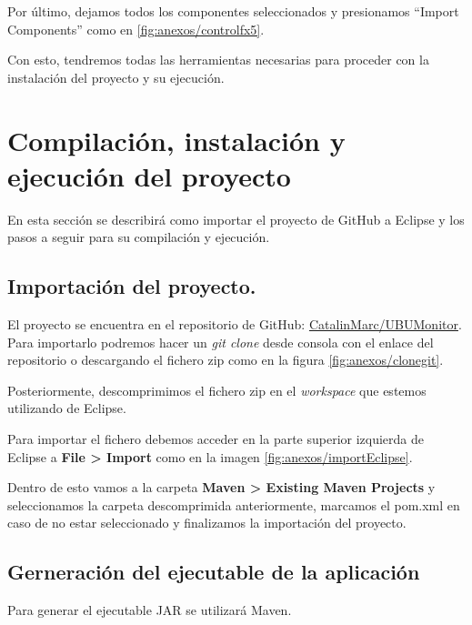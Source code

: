 Por último, dejamos todos los componentes seleccionados y presionamos ``Import Components'' como en \ref{fig:anexos/controlfx5}.


Con esto, tendremos todas las herramientas necesarias para proceder con la instalación del proyecto y su ejecución.

\section{Compilación, instalación y ejecución del proyecto}

En esta sección se describirá como importar el proyecto de GitHub a Eclipse y los pasos a seguir para su compilación y ejecución.

\subsection{Importación del proyecto.}

El proyecto se encuentra en el repositorio de GitHub: \href{https://github.com/CatalinMarc/UBUMonitor}{CatalinMarc/UBUMonitor}. Para importarlo podremos hacer un \emph{git clone} desde consola con el enlace del repositorio o descargando el fichero zip como en la figura \ref{fig:anexos/clonegit}.


Posteriormente, descomprimimos el fichero zip en el \emph{workspace} que estemos utilizando de Eclipse.

Para importar el fichero debemos acceder en la parte superior izquierda de Eclipse a \textbf{File > Import} como en la imagen \ref{fig:anexos/importEclipse}.


Dentro de esto vamos a la carpeta \textbf{Maven > Existing Maven Projects} y seleccionamos la carpeta descomprimida anteriormente, marcamos el pom.xml en caso de no estar seleccionado y finalizamos la importación del proyecto.


\subsection{Gerneración del ejecutable de la aplicación}

Para generar el ejecutable JAR se utilizará Maven.

